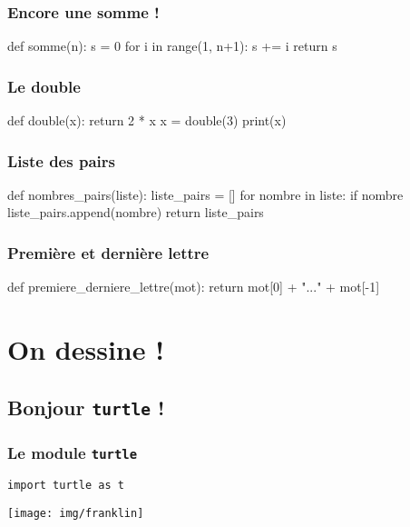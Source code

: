 \documentclass{beamer}
\begin{document}
\begin{frame}[fragile]
   \frametitle{Encore une somme !}

   \begin{pyverbatim}
         def somme(n):
            s = 0
            for i in range(1, n+1):
               s += i
            return s
   \end{pyverbatim}
\end{frame}

\begin{frame}[fragile]
   \frametitle{Le double}

   \begin{pyverbatim}
         def double(x):
            return 2 * x
         x = double(3)
         print(x)
   \end{pyverbatim}
\end{frame}

\begin{frame}[fragile]
   \frametitle{Liste des pairs}

   \begin{pyverbatim}
         def nombres_pairs(liste):
            liste_pairs = []
            for nombre in liste:
               if nombre %
                  liste_pairs.append(nombre)
            return liste_pairs
   \end{pyverbatim}
\end{frame}

\begin{frame}[fragile]
   \frametitle{Première et dernière lettre}

   \begin{pyverbatim}
      def premiere_derniere_lettre(mot):
         return mot[0] + "..." + mot[-1]
   \end{pyverbatim}
\end{frame}

\section{On dessine !}\label{sec:on-dessine}
   \subsection{Bonjour \texttt{turtle} !}\label{subsec:bonjour-turtle}
\begin{frame}
   \frametitle{Le module \texttt{turtle}}

   \texttt{import turtle as t}

   \begin{center}
      \texttt{[image: img/franklin]}
   \end{center}

\end{frame}
\end{document}
